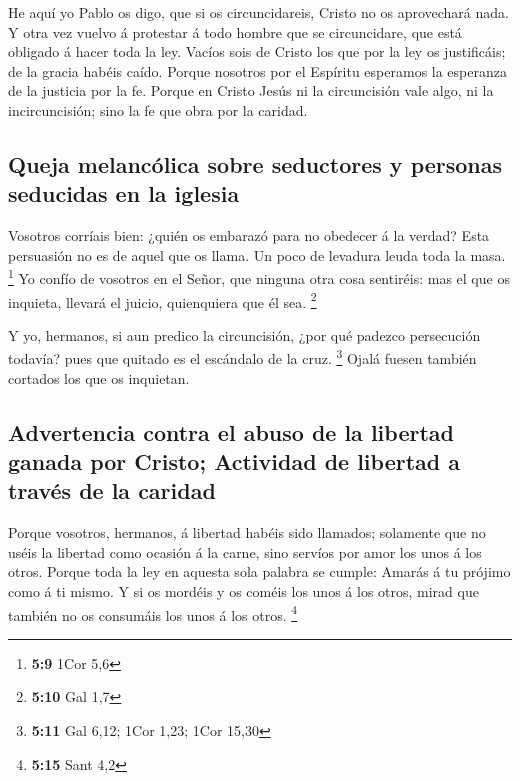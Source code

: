  He aquí yo Pablo os digo, que si os circuncidareis, Cristo
no os aprovechará nada.  Y otra vez vuelvo á protestar á
todo hombre que se circuncidare, que está obligado á hacer toda la ley.
 Vacíos sois de Cristo los que por la ley os justificáis; de
la gracia habéis caído.  Porque nosotros por el Espíritu
esperamos la esperanza de la justicia por la fe.  Porque en
Cristo Jesús ni la circuncisión vale algo, ni la incircuncisión; sino la
fe que obra por la caridad.

\hypertarget{queja-melancuxf3lica-sobre-seductores-y-personas-seducidas-en-la-iglesia}{%
\subsection{Queja melancólica sobre seductores y personas seducidas en
la
iglesia}\label{queja-melancuxf3lica-sobre-seductores-y-personas-seducidas-en-la-iglesia}}

 Vosotros corríais bien: ¿quién os embarazó para no obedecer
á la verdad?  Esta persuasión no es de aquel que os llama.
 Un poco de levadura leuda toda la masa. \footnote{\textbf{5:9}
  1Cor 5,6}  Yo confío de vosotros en el Señor, que ninguna
otra cosa sentiréis: mas el que os inquieta, llevará el juicio,
quienquiera que él sea. \footnote{\textbf{5:10} Gal 1,7}

 Y yo, hermanos, si aun predico la circuncisión, ¿por qué
padezco persecución todavía? pues que quitado es el escándalo de la
cruz. \footnote{\textbf{5:11} Gal 6,12; 1Cor 1,23; 1Cor 15,30}
 Ojalá fuesen también cortados los que os inquietan.

\hypertarget{advertencia-contra-el-abuso-de-la-libertad-ganada-por-cristo-actividad-de-libertad-a-travuxe9s-de-la-caridad}{%
\subsection{Advertencia contra el abuso de la libertad ganada por
Cristo; Actividad de libertad a través de la
caridad}\label{advertencia-contra-el-abuso-de-la-libertad-ganada-por-cristo-actividad-de-libertad-a-travuxe9s-de-la-caridad}}

 Porque vosotros, hermanos, á libertad habéis sido
llamados; solamente que no uséis la libertad como ocasión á la carne,
sino servíos por amor los unos á los otros.  Porque toda la
ley en aquesta sola palabra se cumple: Amarás á tu prójimo como á ti
mismo.  Y si os mordéis y os coméis los unos á los otros,
mirad que también no os consumáis los unos á los otros. \footnote{\textbf{5:15}
  Sant 4,2}

